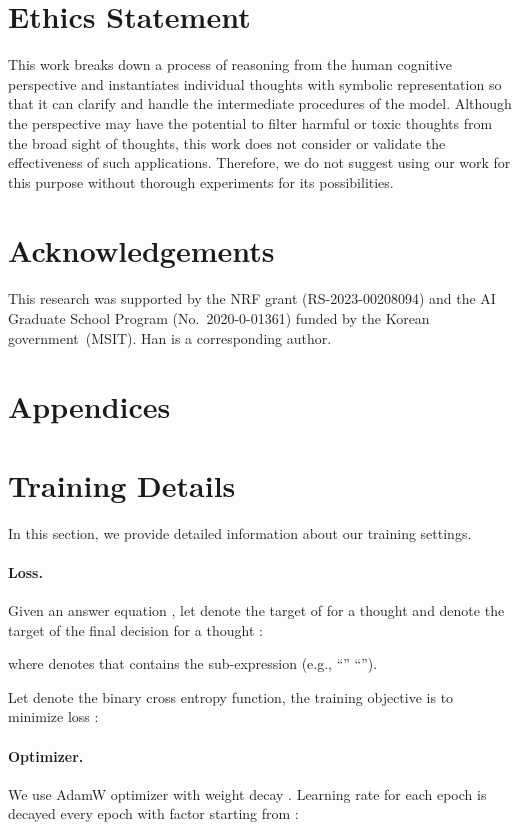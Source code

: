 \documentclass[11pt]{article}
\newcommand{\1}{\mathbb{1}}
\begin{document}
\section*{Ethics Statement}
This work breaks down a process of reasoning from the human cognitive perspective and instantiates individual thoughts with symbolic representation so that it can clarify and handle the intermediate procedures of the model.
Although the perspective may have the potential to filter harmful or toxic thoughts from the broad sight of thoughts, this work does not consider or validate the effectiveness of such applications.
Therefore, we do not suggest using our work for this purpose without thorough experiments for its possibilities.

\section*{Acknowledgements}
This research was supported by the NRF grant (RS-2023-00208094) and the AI Graduate School Program (No.~2020-0-01361) funded by the Korean government~(MSIT).
Han is a corresponding author.



\clearpage
\appendix

\section*{Appendices}
\section{Training Details}
In this section, we provide detailed information about our training settings.
\label{sec:appendix_training}

\paragraph{Loss.}
Given an answer equation , let  denote the target of  for a thought  and  denote the target of the final decision  for a thought :

where  denotes that  contains the sub-expression  (e.g., ``''  ``'').

Let  denote the binary cross entropy function, the training objective is to minimize loss :


\paragraph{Optimizer.}
We use AdamW optimizer \citep{loshchilov-etal-2017-decoupled} with weight decay .
Learning rate  for each epoch  is decayed every  epoch with factor 
starting from :
\end{document}
